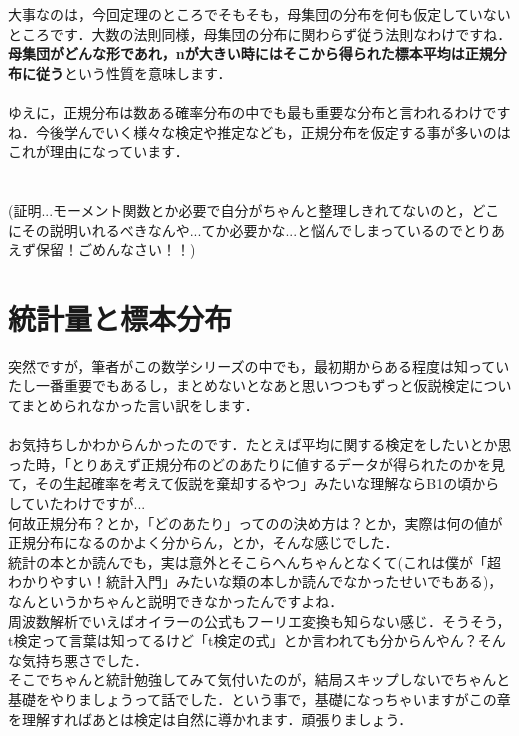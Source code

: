 \documentclass[11pt,a4paper,uplatex]{ujreport} 	%
\begin{document}
大事なのは，今回定理のところでそもそも，母集団の分布を何も仮定していないところです．大数の法則同様，母集団の分布に関わらず従う法則なわけですね．\\

\textbf{母集団がどんな形であれ，nが大きい時にはそこから得られた標本平均は正規分布に従う}という性質を意味します．\\
\\

ゆえに，正規分布は数ある確率分布の中でも最も重要な分布と言われるわけですね．今後学んでいく様々な検定や推定なども，正規分布を仮定する事が多いのはこれが理由になっています．\\
\\
\\

(証明...モーメント関数とか必要で自分がちゃんと整理しきれてないのと，どこにその説明いれるべきなんや...てか必要かな...と悩んでしまっているのでとりあえず保留！ごめんなさい！！)


\chapter{統計量と標本分布}
突然ですが，筆者がこの数学シリーズの中でも，最初期からある程度は知っていたし一番重要でもあるし，まとめないとなあと思いつつもずっと仮説検定についてまとめられなかった言い訳をします．\\
\\

お気持ちしかわからんかったのです．たとえば平均に関する検定をしたいとか思った時，「とりあえず正規分布のどのあたりに値するデータが得られたのかを見て，その生起確率を考えて仮説を棄却するやつ」みたいな理解ならB1の頃からしていたわけですが...\\

何故正規分布？とか，「どのあたり」ってのの決め方は？とか，実際は何の値が正規分布になるのかよく分からん，とか，そんな感じでした．\\

統計の本とか読んでも，実は意外とそこらへんちゃんとなくて(これは僕が「超わかりやすい！統計入門」みたいな類の本しか読んでなかったせいでもある)，なんというかちゃんと説明できなかったんですよね．\\

周波数解析でいえばオイラーの公式もフーリエ変換も知らない感じ．そうそう，t検定って言葉は知ってるけど「t検定の式」とか言われても分からんやん？そんな気持ち悪さでした．\\

そこでちゃんと統計勉強してみて気付いたのが，結局スキップしないでちゃんと基礎をやりましょうって話でした．という事で，基礎になっちゃいますがこの章を理解すればあとは検定は自然に導かれます．頑張りましょう．
\end{document}
